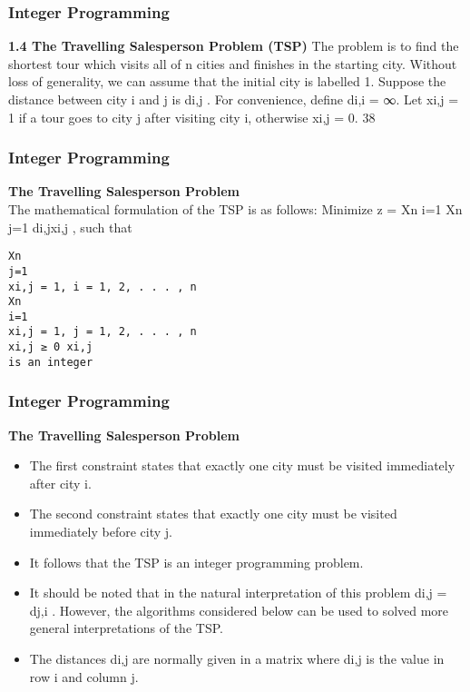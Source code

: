\begin{frame} 
\frametitle{Integer Programming}     
\noindent \textbf{1.4 The Travelling Salesperson Problem (TSP)}
The problem is to find the shortest tour which visits all of n cities
and finishes in the starting city.
Without loss of generality, we can assume that the initial city is
labelled 1.
Suppose the distance between city i and j is di,j
. For convenience,
define di,i = ∞.
Let xi,j = 1 if a tour goes to city j after visiting city i, otherwise
xi,j = 0.
38 \end{frame}  
\begin{frame} 
\frametitle{Integer Programming}     
\noindent \textbf{The Travelling Salesperson Problem}\\
The mathematical formulation of the TSP is as follows: Minimize
z =
Xn
i=1
Xn
j=1
di,jxi,j
,
such that
\begin{verbatim}
Xn
j=1
xi,j = 1, i = 1, 2, . . . , n
Xn
i=1
xi,j = 1, j = 1, 2, . . . , n
xi,j ≥ 0 xi,j
is an integer
\end{verbatim}
\end{frame}  
\begin{frame} 
\frametitle{Integer Programming}     
\noindent \textbf{The Travelling Salesperson Problem}\\
\begin{itemize}
	\item The first constraint states that exactly one city must be visited
	immediately after city i.
	\item The second constraint states that exactly one city must be visited
	immediately before city j.
	\item It follows that the TSP is an integer programming problem.
	\item It should be noted that in the natural interpretation of this
	problem di,j = dj,i
	. However, the algorithms considered below can
	be used to solved more general interpretations of the TSP.
	\item The distances di,j are normally given in a matrix where di,j
	is the
	value in row i and column j.
\end{itemize}

\end{frame}  
